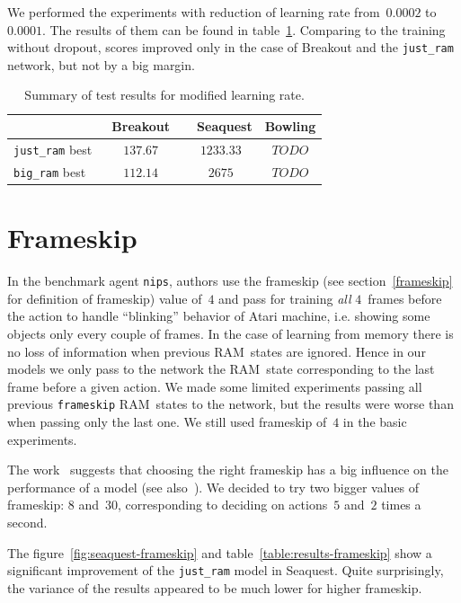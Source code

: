 We performed the experiments with reduction of learning rate from~$0.0002$ to~$0.0001$. The results of them can be found in table~\ref{table:rate}. Comparing to the training without dropout, scores improved only in the case of Breakout and the \texttt{just\_ram} network, but not by a big margin.

\begin{table}[h]
\centering
\begin{tabularx}{0.7\textwidth}{ X c c c }
  \toprule
  &\ Breakout\ &\ Seaquest & Bowling \\
  \midrule
  \texttt{just\_ram} best & $137.67$ & $1233.33$ & $TODO$ \\
  \texttt{big\_ram} best  & $112.14$ & $2675$ & $TODO$ \\
  \bottomrule
\end{tabularx}
\caption{Summary of test results for modified learning rate.}
\label{table:rate}
\end{table}
\section{Frameskip}\label{our-frameskip}
In the benchmark agent \texttt{nips}, authors use the frameskip (see section~\ref{frameskip} for definition of frameskip) value of~$4$ and pass for training \emph{all} $4$~frames before the action to handle ``blinking'' behavior of Atari machine, i.e. showing some objects only every couple of frames.
In the case of learning from memory there is no loss of information when previous RAM~states are ignored. Hence in our models we only pass to the network the RAM~state corresponding to the last frame before a given action. We made some limited experiments passing all previous \texttt{frameskip} RAM~states to the network, but the results were worse than when passing only the last one. We still used frameskip of~$4$ in the basic experiments.

The work~\cite{frameskip} suggests that choosing the right frameskip has a big influence on the performance of a model (see also~\cite{microsoft-frameskip}). We decided to try two bigger values of frameskip: $8$ and~$30$, corresponding to deciding on actions~$5$ and~$2$ times a second.

The figure~\ref{fig:seaquest-frameskip} and table~\ref{table:results-frameskip} show a significant improvement of the \texttt{just\_ram} model in Seaquest. Quite surprisingly, the variance of the results appeared to be much lower for higher frameskip.

